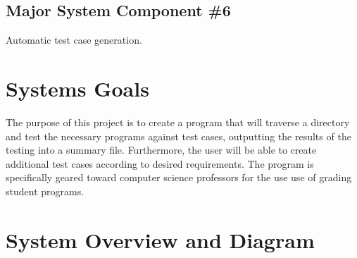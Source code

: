 \subsection{Major System Component \#6}
Automatic test case generation.

\section{Systems Goals}The purpose of this project is to create a program that will traverse a directory and test the necessary programs against test cases, outputting the results of the testing into a summary file.  Furthermore, the user will be able to create additional test cases according to desired requirements. The program is specifically geared toward computer science professors for the use use of grading student programs. 

\section{System Overview and Diagram}

